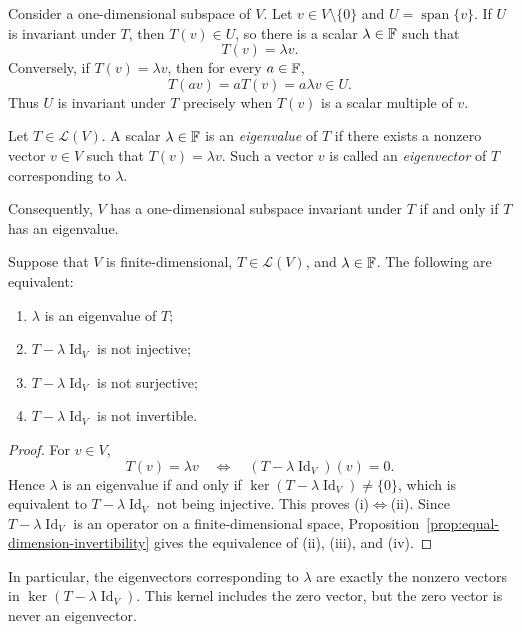 Consider a one-dimensional subspace of $V$. Let
$v\in V\setminus\{0\}$ and $U=\operatorname{span}\{v\}$. If
$U$ is invariant under $T$, then $T(v)\in U$, so there is a
scalar $\lambda\in\mathbb{F}$ such that
\[
  T(v)=\lambda v.
\]
Conversely, if $T(v)=\lambda v$, then for every $a\in\mathbb{F}$,
\[
  T(av)=aT(v)=a\lambda v\in U.
\]
Thus $U$ is invariant under $T$ precisely when $T(v)$ is a
scalar multiple of $v$.

\begin{definition}
  Let $T\in\mathcal L(V)$. A scalar $\lambda\in\mathbb{F}$ is an
  \emph{eigenvalue} of $T$ if there exists a nonzero vector
  $v\in V$ such that $T(v)=\lambda v$. Such a vector $v$ is
  called an \emph{eigenvector} of $T$ corresponding to $\lambda$.
\end{definition}

Consequently, $V$ has a one-dimensional subspace invariant under
$T$ if and only if $T$ has an eigenvalue.

\begin{proposition}\label{prop:eigenvalue-equivalences}
  Suppose that $V$ is finite-dimensional, $T\in\mathcal L(V)$,
  and $\lambda\in\mathbb{F}$. The following are equivalent:
  \begin{enumerate}[label=(\roman*)]
    \item $\lambda$ is an eigenvalue of $T$;
    \item $T-\lambda\operatorname{Id}_V$ is not injective;
    \item $T-\lambda\operatorname{Id}_V$ is not surjective;
    \item $T-\lambda\operatorname{Id}_V$ is not invertible.
  \end{enumerate}
\end{proposition}

\begin{proof}
  For $v\in V$,
  \[
    T(v)=\lambda v
      \quad\Longleftrightarrow\quad
      (T-\lambda\operatorname{Id}_V)(v)=0.
  \]
  Hence $\lambda$ is an eigenvalue if and only if
  $\ker(T-\lambda\operatorname{Id}_V)\neq\{0\}$, which is
  equivalent to $T-\lambda\operatorname{Id}_V$ not being
  injective. This proves (i)$\Longleftrightarrow$(ii).
  Since $T-\lambda\operatorname{Id}_V$ is an operator on a
  finite-dimensional space,
  Proposition~\ref{prop:equal-dimension-invertibility} gives the
  equivalence of (ii), (iii), and (iv).
\end{proof}

In particular, the eigenvectors corresponding to $\lambda$ are
exactly the nonzero vectors in
$\ker(T-\lambda\operatorname{Id}_V)$. This kernel includes the
zero vector, but the zero vector is never an eigenvector.

